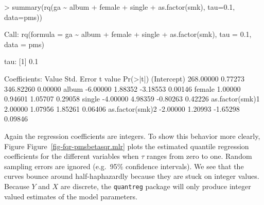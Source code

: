 \documentclass[
  letterpaper,
  DIV=11,
  numbers=noendperiod]{scrartcl}
\newenvironment{Shaded}{\begin{snugshade}}{\end{snugshade}}
\newcommand{\AttributeTok}[1]{\textcolor[rgb]{0.40,0.45,0.13}{#1}}
\newcommand{\DecValTok}[1]{\textcolor[rgb]{0.68,0.00,0.00}{#1}}
\newcommand{\ErrorTok}[1]{\textcolor[rgb]{0.68,0.00,0.00}{#1}}
\newcommand{\FloatTok}[1]{\textcolor[rgb]{0.68,0.00,0.00}{#1}}
\newcommand{\FunctionTok}[1]{\textcolor[rgb]{0.28,0.35,0.67}{#1}}
\newcommand{\NormalTok}[1]{\textcolor[rgb]{0.00,0.23,0.31}{#1}}
\newcommand{\SpecialCharTok}[1]{\textcolor[rgb]{0.37,0.37,0.37}{#1}}
\begin{document}
\begin{Shaded}
\begin{Highlighting}[]
\SpecialCharTok{\textgreater{}} \FunctionTok{summary}\NormalTok{(}\FunctionTok{rq}\NormalTok{(ga }\SpecialCharTok{\textasciitilde{}}\NormalTok{ album }\SpecialCharTok{+}\NormalTok{ female }\SpecialCharTok{+}\NormalTok{ single }\SpecialCharTok{+} \FunctionTok{as.factor}\NormalTok{(smk), }\AttributeTok{tau=}\FloatTok{0.1}\NormalTok{, }\AttributeTok{data=}\NormalTok{pms))}

\NormalTok{Call}\SpecialCharTok{:} \FunctionTok{rq}\NormalTok{(}\AttributeTok{formula =}\NormalTok{ ga }\SpecialCharTok{\textasciitilde{}}\NormalTok{ album }\SpecialCharTok{+}\NormalTok{ female }\SpecialCharTok{+}\NormalTok{ single }\SpecialCharTok{+} \FunctionTok{as.factor}\NormalTok{(smk), }\AttributeTok{tau =} \FloatTok{0.1}\NormalTok{,}
    \AttributeTok{data =}\NormalTok{ pms)}

\NormalTok{tau}\SpecialCharTok{:}\NormalTok{ [}\DecValTok{1}\NormalTok{] }\FloatTok{0.1}

\NormalTok{Coefficients}\SpecialCharTok{:}
\NormalTok{                Value     Std. Error t value   }\FunctionTok{Pr}\NormalTok{(}\SpecialCharTok{\textgreater{}}\ErrorTok{|}\NormalTok{t}\SpecialCharTok{|}\NormalTok{)}
\NormalTok{(Intercept)     }\FloatTok{268.00000}   \FloatTok{0.77273}  \FloatTok{346.82260}   \FloatTok{0.00000}
\NormalTok{album            }\SpecialCharTok{{-}}\FloatTok{6.00000}   \FloatTok{1.88352}   \SpecialCharTok{{-}}\FloatTok{3.18553}   \FloatTok{0.00146}
\NormalTok{female            }\FloatTok{1.00000}   \FloatTok{0.94601}    \FloatTok{1.05707}   \FloatTok{0.29058}
\NormalTok{single           }\SpecialCharTok{{-}}\FloatTok{4.00000}   \FloatTok{4.98359}   \SpecialCharTok{{-}}\FloatTok{0.80263}   \FloatTok{0.42226}
\FunctionTok{as.factor}\NormalTok{(smk)}\DecValTok{1}   \FloatTok{2.00000}   \FloatTok{1.07956}    \FloatTok{1.85261}   \FloatTok{0.06406}
\FunctionTok{as.factor}\NormalTok{(smk)}\DecValTok{2}  \SpecialCharTok{{-}}\FloatTok{2.00000}   \FloatTok{1.20993}   \SpecialCharTok{{-}}\FloatTok{1.65298}   \FloatTok{0.09846}
\end{Highlighting}
\end{Shaded}

Again the regression coefficients are integers. To show this behavior
more clearly, Figure Figure~\ref{fig-fqr-pmsbetasqr.mlr} plots the
estimated quantile regression coefficients for the different variables
when \(\tau\) ranges from zero to one. Random sampling errors are
ignored (e.g.~95\% confidence intervals). We see that the curves bounce
around half-haphazardly because they are stuck on integer values.
Because \(Y\) and \(X\) are discrete, the \texttt{quantreg} package will
only produce integer valued estimates of the model parameters.
\end{document}
